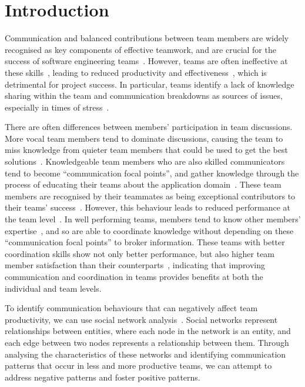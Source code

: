 \section{Introduction}
Communication and balanced contributions between team members are widely recognised as key components of effective teamwork, and are crucial for the success of software engineering teams~\cite{curtisFieldStudySoftware1988,hoeglTeamworkQualitySuccess2001, mensahImpactTeamworkQuality2024}. However, teams are often ineffective at these skills~\cite{krautCoordinationSoftwareDevelopment1995}, leading to reduced productivity and effectiveness~\cite{r.noelExploringCollaborativeWriting2018,strodeTeamworkEffectivenessModel2022a}, which is detrimental for project success. In particular, teams identify a lack of knowledge sharing within the team and communication breakdowns as sources of issues, especially in times of stress~\cite{salasHowCanYou1997}.

There are often differences between members' participation in team discussions. More vocal team members tend to dominate discussions, causing the team to miss knowledge from quieter team members that could be used to get the best solutions~\cite{hoeglTeamworkQualitySuccess2001}. Knowledgeable team members who are also skilled communicators tend to become ``communication focal points'', and gather knowledge through the process of educating their teams about the application domain~\cite{omalleyAnalysisSocialNetworks2008}. These team members are recognised by their teammates as being exceptional contributors to their teams' success~\cite{curtisFieldStudySoftware1988}. However, this behaviour leads to reduced performance at the team level~\cite{sparroweSocialNetworksPerformance2001}. In well performing teams, members tend to know other members' expertise~\cite{r.noelExploringCollaborativeWriting2018}, and so are able to coordinate knowledge without depending on these ``communication focal points'' to broker information. These teams with better coordination skills show not only better performance, but also higher team member satisfaction than their counterparts~\cite{mensahImpactTeamworkQuality2024,seersTeammemberExchangeQuality1989}, indicating that improving communication and coordination in teams provides benefits at both the individual and team levels. 

To identify communication behaviours that can negatively affect team productivity, we can use social network analysis~\cite{otteSocialNetworkAnalysis2002}. Social networks represent relationships between entities, where each node in the network is an entity, and each edge between two nodes represents a relationship between them. Through analysing the characteristics of these networks and identifying communication patterns that occur in less and more productive teams, we can attempt to address negative patterns and foster positive patterns. 


